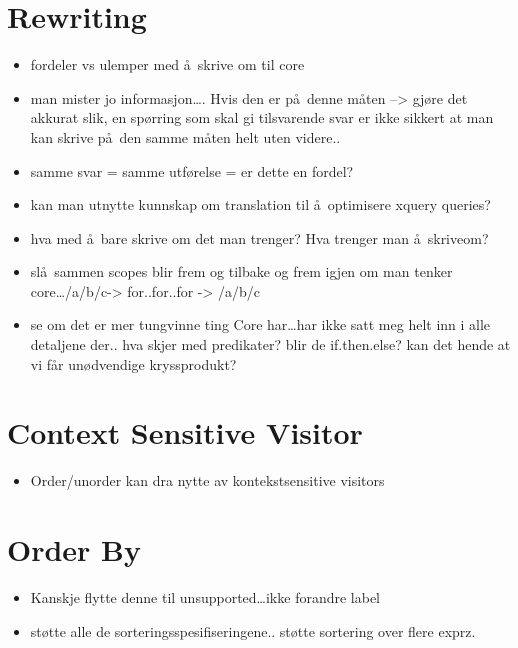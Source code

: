 \section{Rewriting}
\label{sect:disc:rewriting}
\begin{itemize}
  \item fordeler vs ulemper med \aa~skrive om til core
  \item man mister jo informasjon\ldots. Hvis den er p\aa~denne m\aa ten --> gj\o re det akkurat
	  slik, en sp\o rring som skal gi tilsvarende svar er ikke sikkert at man kan
	  skrive p\aa~den samme m\aa ten helt uten videre..  
  \item samme svar = samme utf\o relse = er dette en fordel?
  \item kan man utnytte kunnskap om translation til \aa~optimisere xquery queries?
  \item hva med \aa~bare skrive om det man trenger? Hva trenger man \aa~skriveom?
  \item sl\aa~sammen scopes blir frem og tilbake og frem igjen om man tenker core\ldots /a/b/c-> for..for..for ->
  /a/b/c
  \item se om det er mer tungvinne ting Core har\ldots har ikke satt meg helt inn i alle detaljene der.. hva skjer
  med predikater? blir de if.then.else? kan det hende at vi f\aa r un\o dvendige kryssprodukt?
\end{itemize}





\section{Context Sensitive Visitor}
\label{sect:disc:contextSens}
\begin{itemize}
  \item Order/unorder kan dra nytte av kontekstsensitive visitors
\end{itemize}


\section{Order By}
\label{sect:disc:orderby}
\begin{itemize}
  \item Kanskje flytte denne til unsupported\ldots ikke forandre label
  \item st\o tte alle de sorteringsspesifiseringene.. st\o tte sortering over flere exprz.
\end{itemize}

